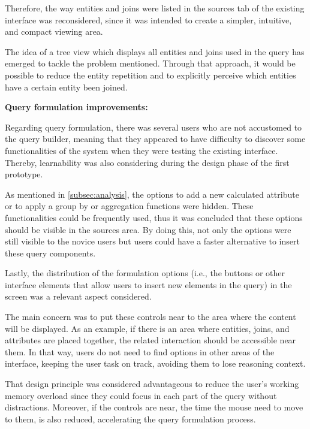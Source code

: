 Therefore, the way entities and joins were listed in the sources tab of the existing interface was reconsidered, since it was intended to create a simpler, intuitive, and compact viewing area.

The idea of a tree view which displays all entities and joins used in the query has emerged to tackle the problem mentioned. Through that approach, it would be possible to reduce the entity repetition and to explicitly perceive which entities have a certain entity been joined.

\medskip

\textbf{Query formulation improvements: }

\medskip

Regarding query formulation, there was several users who are not accustomed to the query builder, meaning that they appeared to have difficulty to discover some functionalities of the system when they were testing the existing interface. Thereby, learnability was also considering during the design phase of the first prototype.

As mentioned in \ref{subsec:analysis}, the options to add a new calculated attribute or to apply a group by or aggregation functions were hidden. These functionalities could be frequently used, thus it was concluded that these options should be visible in the sources area. By doing this, not only the options were still visible to the novice users but users could have a faster alternative to insert these query components.


Lastly, the distribution of the formulation options (i.e., the buttons or other interface elements that allow users to insert new elements in the query) in the screen was a relevant aspect considered.

The main concern was to put these controls near to the area where the content will be displayed. As an example, if there is an area where entities, joins, and attributes are placed together, the related interaction should be accessible near them. In that way, users do not need to find options in other areas of the interface, keeping the user task on track, avoiding them to lose reasoning context.

That design principle was considered advantageous to reduce the user's working memory overload since they could focus in each part of the query without distractions. Moreover, if the controls are near, the time the mouse need to move to them, is also reduced, accelerating the query formulation process.

